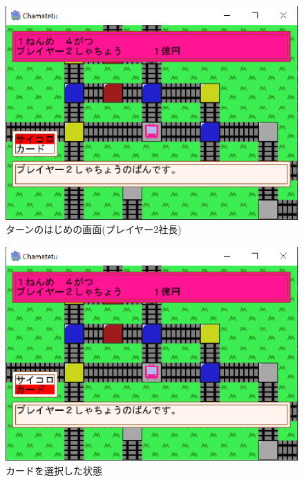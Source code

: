 \documentclass[a4j]{jarticle}
\begin{document}
        \begin{figure}[H]
            \centering
            \includegraphics[scale=1.3]{st2p2.eps}
            \caption{ターンのはじめの画面(プレイヤー2社長)}
             \label{st2p2}
            \end{figure}   

        \begin{figure}[H]
            \centering
            \includegraphics[scale=1.3]{st2p3.eps}
            \caption{カードを選択した状態}
             \label{st2p3}
            \end{figure}   
        
\end{document}
